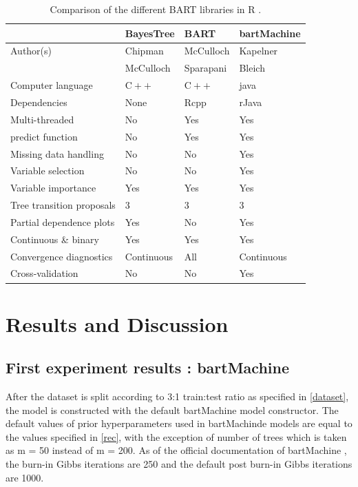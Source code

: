 \documentclass{usiinftr}
\begin{document}
\begin{table}[h!]
\centering
\caption{Comparison of the different BART libraries in R \cite{}.}
\begin{tabular}{l|lll} 
& BayesTree & BART & bartMachine \\
\hline Author(s) & Chipman & McCulloch & Kapelner \\
& McCulloch & Sparapani & Bleich \\
Computer language & $\mathrm{C}++$ & $\mathrm{C}++$ & java \\
Dependencies & None & Rcpp & rJava \\
Multi-threaded & No & Yes & Yes \\
predict function & No & Yes & Yes \\
Missing data handling & No & No & Yes \\
Variable selection & No & No & Yes \\
Variable importance & Yes & Yes & Yes \\
Tree transition proposals & 3 & 3 & 3 \\
Partial dependence plots & Yes & No & Yes \\
Continuous \& binary & Yes & Yes & Yes \\
Convergence diagnostics & Continuous & All & Continuous \\
Cross-validation & No & No & Yes \\
\hline
\end{tabular}
\end{table}




\section{Results and Discussion}
\subsection{First experiment results : bartMachine}
After the dataset is split according to 3:1 train:test ratio as specified in \ref{dataset}, the model is constructed with the default bartMachine model constructor. The default values of prior hyperparameters used in bartMachinde models are equal to the values specified in \ref{rec}, with the exception of number of trees which is taken as m = 50 instead of m = 200. As of the official documentation of bartMachine \cite{}, the burn-in Gibbs iterations are 250 and the default post burn-in Gibbs iterations are 1000. 
\end{document}
